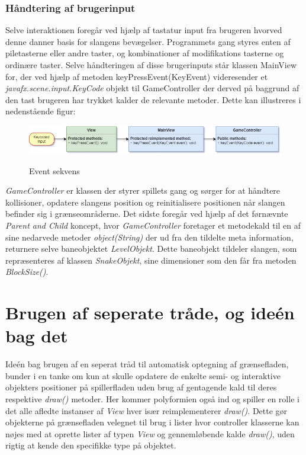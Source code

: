 \documentclass[]{article}
\begin{document}
\subsubsection{Håndtering af brugerinput}

Selve interaktionen foregår ved hjælp af tastatur input fra brugeren hvorved denne danner basis for slangens bevægelser. Programmets gang styres enten af piletasterne eller andre taster, og kombinationer af modifikations tasterne og ordinære taster. Selve håndteringen af disse brugerinputs står klassen MainView for, der ved hjælp af metoden keyPressEvent(KeyEvent) videresender et \textit{javafx.scene.input.KeyCode}  objekt til GameController der derved på baggrund af den tast brugeren har trykket kalder de relevante metoder. Dette kan illustreres i nedenstående figur:


\begin{figure}[h!]
	\centering
	\includegraphics[width=\linewidth]{Event_sequence.jpg}
	\label{fig:Event}
	\caption{Event sekvens}
\end{figure}

\textit{GameController} er klassen der styrer spillets gang og sørger for at håndtere kollisioner, opdatere slangens position og reinitialisere positionen når slangen befinder sig i grænseområderne. Det sidste foregår ved hjælp af det førnævnte \textit{Parent and Child} koncept, hvor \textit{GameController} foretager et metodekald til en af sine nedarvede metoder \textit{object(String)} der ud fra den tildelte meta information, returnere selve baneobjektet \textit{LevelObjekt}. Dette baneobjekt tildeler slangen, som repræsenteres af klassen \textit{SnakeObjekt}, sine dimensioner som den får fra metoden \textit{BlockSize()}.\\

\section{Brugen af seperate tråde, og ideén bag det}

Ideén bag brugen af en seperat tråd til automatisk optegning af grænsefladen, bunder i en tanke om kun at skulle opdatere de enkelte semi- og interaktive objekters positioner på spillerfladen uden brug af gentagende kald til deres respektive \textit{draw()} metoder. Her kommer polyformien også ind og spiller en rolle i det alle afledte instanser af \textit{View} hver især reimplementerer \textit{draw()}. Dette gør objekterne på grænsefladen velegnet til brug i lister hvor controller klasserne kan nøjes med at oprette lister af typen \textit{View} og gennemløbende kalde \textit{draw()}, uden rigtig at kende den specifikke type på objektet. 
\end{document}
